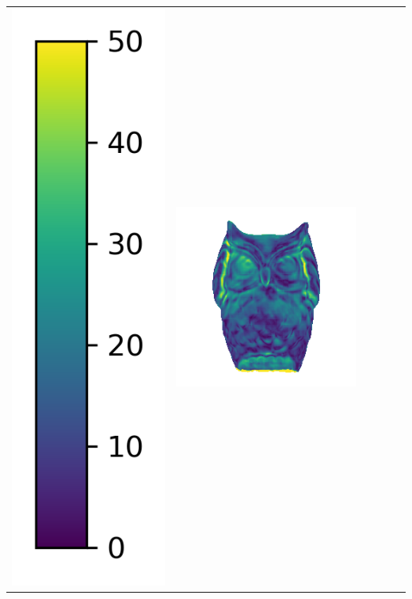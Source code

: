 \begin{center}
\begin{tabularx}{\linewidth}{@{}Y@{}Y@{}Y@{}Y@{}Y@{}Y@{}}
\includegraphics[width=0.2\linewidth]{semisynthetic/colorbar_error_vertical.png} &
\includegraphics[width=\linewidth]{semisynthetic/20150514_15_ours_err.png} &

\end{tabularx}
\end{center}
